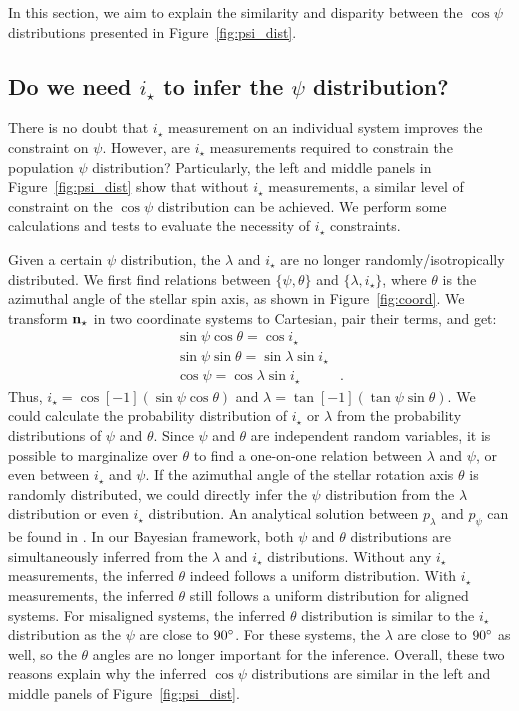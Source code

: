 \documentclass[twocolumn,times]{aastex631}
\begin{document}
In this section, we aim to explain the similarity and disparity between the $\cos{\psi}$ distributions presented in Figure~\ref{fig:psi_dist}.

\subsection{Do we need \texorpdfstring{$i_\star$}{istar} to infer the \texorpdfstring{$\psi$}{psi} distribution?}

There is no doubt that $i_\star$ measurement on an individual system improves the constraint on $\psi$. However, are $i_\star$ measurements required to constrain the population $\psi$ distribution? Particularly, the left and middle panels in Figure~\ref{fig:psi_dist} show that without $i_\star$ measurements, a similar level of constraint on the $\cos{\psi}$ distribution can be achieved. We perform some calculations and tests to evaluate the necessity of $i_\star$ constraints.

Given a certain $\psi$ distribution, the $\lambda$ and $i_\star$ are no longer randomly/isotropically distributed. We first find relations between $\{\psi, \theta\}$ and $\{\lambda, i_\star\}$, where $\theta$ is the azimuthal angle of the stellar spin axis, as shown in Figure~\ref{fig:coord}. We transform $\bf{n}_{\star}$ in two coordinate systems to Cartesian, pair their terms, and get:
\begin{align}
    \sin{\psi}\cos{\theta} = \cos{i_\star}& \nonumber\\
    \sin{\psi}\sin{\theta} = \sin{\lambda}\sin{i_\star}& \nonumber\\
    \cos{\psi} = \cos{\lambda}\sin{i_\star}&.
\end{align}
Thus, $i_\star = \cos[-1](\sin{\psi}\cos{\theta})$ and $\lambda = \tan[-1](\tan{\psi}\sin{\theta})$. 
We could calculate the probability distribution of $i_\star$ or $\lambda$ from the probability distributions of $\psi$ and $\theta$. Since $\psi$ and $\theta$ are independent random variables, it is possible to marginalize over $\theta$ to find a one-on-one relation between $\lambda$ and $\psi$, or even between $i_\star$ and $\psi$.
If the azimuthal angle of the stellar rotation axis $\theta$ is randomly distributed, we could directly infer the $\psi$ distribution from the $\lambda$ distribution or even $i_\star$ distribution.
An analytical solution between $p_\lambda$ and $p_\psi$ can be found in \cite{Fabrycky09}. 
In our Bayesian framework, both $\psi$ and $\theta$ distributions are simultaneously inferred from the $\lambda$ and $i_\star$ distributions. Without any $i_\star$ measurements, the inferred $\theta$ indeed follows a uniform distribution. With $i_\star$ measurements, the inferred $\theta$ still follows a uniform distribution for aligned systems. For misaligned systems, the inferred $\theta$ distribution is similar to the $i_\star$ distribution as the $\psi$ are close to $90\mbox{$^\circ$}$. For these systems, the $\lambda$ are close to $90\mbox{$^\circ$}$ as well, so the $\theta$ angles are no longer important for the inference. Overall, these two reasons explain why the inferred $\cos{\psi}$ distributions are similar in the left and middle panels of Figure~\ref{fig:psi_dist}.
 
\end{document}
